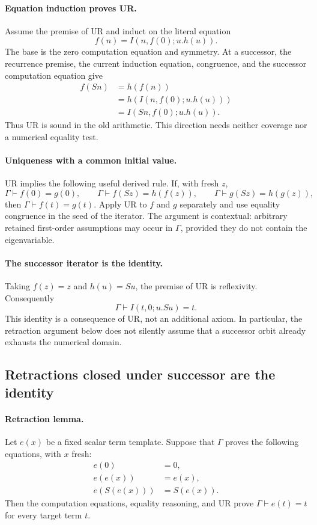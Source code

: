 \paragraph{Equation induction proves UR.}
Assume the premise of UR and induct on the literal equation
\[
 f(n)=I(n,f(0);u.h(u)).
\]
The base is the zero computation equation and symmetry.  At a successor,
the recurrence premise, the current induction equation, congruence,
and the successor computation equation give
\begin{align*}
 f(Sn)&=h(f(n))\\
      &=h(I(n,f(0);u.h(u)))\\
      &=I(Sn,f(0);u.h(u)).
\end{align*}
Thus UR is sound in the old arithmetic.  This direction needs neither
coverage nor a numerical equality test.

\paragraph{Uniqueness with a common initial value.}
UR implies the following useful derived rule.  If, with fresh $z$,
\[
 \Gamma\vdash f(0)=g(0),\qquad
 \Gamma\vdash f(Sz)=h(f(z)),\qquad
 \Gamma\vdash g(Sz)=h(g(z)),
\]
then $\Gamma\vdash f(t)=g(t)$.  Apply UR to $f$ and $g$ separately
and use equality congruence in the seed of the iterator.  The argument
is contextual: arbitrary retained first-order assumptions may occur
in $\Gamma$, provided they do not contain the eigenvariable.

\paragraph{The successor iterator is the identity.}
Taking $f(z)=z$ and $h(u)=Su$, the premise of UR is reflexivity.
Consequently
\[
 \Gamma\vdash I(t,0;u.Su)=t.
 \tag{Id}\label{eq:ur-identity}
\]
This identity is a consequence of UR, not an additional axiom.  In
particular, the retraction argument below does not silently assume
that a successor orbit already exhausts the numerical domain.

\subsection{Retractions closed under successor are the identity}

\paragraph{Retraction lemma.}
Let $e(x)$ be a fixed scalar term template.  Suppose that $\Gamma$
proves the following equations, with $x$ fresh:
\begin{align}
 e(0)&=0,\label{eq:ur-e0}\\
 e(e(x))&=e(x),\label{eq:ur-idempotence}\\
 e(S(e(x)))&=S(e(x)).\label{eq:ur-closed}
\end{align}
Then the computation equations, equality reasoning, and UR prove
$\Gamma\vdash e(t)=t$ for every target term $t$.

